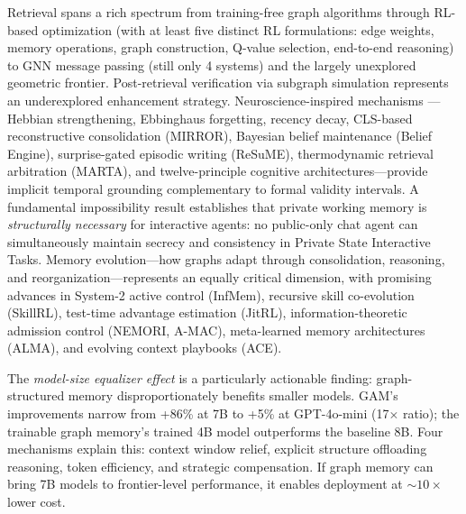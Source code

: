 \documentclass[hf]{ceurart}
\begin{document}
Retrieval spans a rich spectrum from training-free graph algorithms
through RL-based optimization (with at least five distinct RL
formulations: edge weights, memory operations, graph construction,
Q-value selection, end-to-end reasoning) to GNN message passing (still
only 4 systems) and the largely unexplored geometric frontier.
Post-retrieval verification via subgraph simulation represents an
underexplored enhancement strategy. Neuroscience-inspired mechanisms
---Hebbian strengthening, Ebbinghaus forgetting, recency decay,
CLS-based reconstructive consolidation (MIRROR), Bayesian belief
maintenance (Belief Engine), surprise-gated episodic writing (ReSuME),
thermodynamic retrieval arbitration (MARTA), and twelve-principle
cognitive architectures---provide implicit temporal grounding
complementary to formal validity intervals.
A fundamental impossibility result establishes that private working
memory is \emph{structurally necessary} for interactive agents: no
public-only chat agent can simultaneously maintain secrecy and
consistency in Private State Interactive Tasks.
Memory evolution---how graphs adapt through
consolidation, reasoning, and reorganization---represents an equally
critical dimension, with promising advances in System-2 active control
(InfMem), recursive skill co-evolution (SkillRL), test-time
advantage estimation (JitRL), information-theoretic admission
control (NEMORI, A-MAC), meta-learned memory architectures (ALMA),
and evolving context playbooks (ACE).

The \emph{model-size equalizer effect} is a particularly actionable
finding: graph-structured memory disproportionately benefits smaller
models. GAM's improvements narrow from +86\% at 7B to +5\% at
GPT-4o-mini (17$\times$ ratio); the trainable graph memory's trained
4B model outperforms the baseline 8B. Four mechanisms explain this:
context window relief, explicit structure offloading reasoning, token
efficiency, and strategic compensation. If graph memory can bring 7B
models to frontier-level performance, it enables deployment at
${\sim}10\times$ lower cost.
\end{document}
